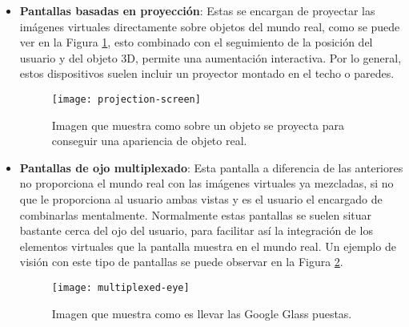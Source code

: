 \begin{itemize}

\newpage

  \item \textbf{Pantallas basadas en proyección}: Estas se encargan de proyectar las imágenes virtuales directamente sobre objetos del mundo real, como se puede ver en la Figura \ref{figura-pantalla-proyeccion}, esto combinado con el seguimiento de la posición del usuario y del objeto 3D, permite una aumentación interactiva. Por lo general, estos dispositivos suelen incluir un proyector montado en el techo o paredes.

  \begin{figure}[h]
    \centering
    \texttt{[image: projection-screen]}
    \caption{Imagen que muestra como sobre un objeto se proyecta para conseguir una apariencia de objeto real.\protect\footnotemark}
    \label{figura-pantalla-proyeccion}
  \end{figure}


  \newpage

  \item \textbf{Pantallas de ojo multiplexado}: Esta pantalla a diferencia de las anteriores no proporciona el mundo real con las imágenes virtuales ya mezcladas, si no que le proporciona al usuario ambas vistas y es el usuario el encargado de combinarlas mentalmente. Normalmente estas pantallas se suelen situar bastante cerca del ojo del usuario, para facilitar así la integración de los elementos virtuales que la pantalla muestra en el mundo real. Un ejemplo de visión con este tipo de pantallas se puede observar en la Figura \ref{figura-ojo-multiplexado}.

  \begin{figure}[h]
    \centering
    \texttt{[image: multiplexed-eye]}
    \caption{Imagen que muestra como es llevar las Google Glass puestas.\protect\footnotemark}
    \label{figura-ojo-multiplexado}
  \end{figure}


\end{itemize}


